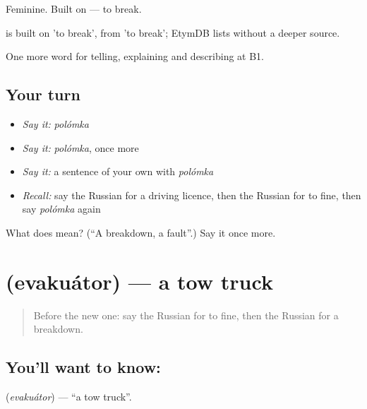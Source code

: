Feminine. Built on \emph{} — to break.

\begin{cousinweb}
\emph{} is built on \emph{} 'to break', from \emph{} 'to break'; EtymDB lists \emph{} without a deeper source.
\end{cousinweb}

\begin{grammarlens}[title={What you've built}]
One more word for telling, explaining and describing at B1.
\end{grammarlens}

\subsection*{Your turn}
\begin{itemize}
\raggedright
  \item \emph{Say it:} \emph{polómka}
  \item \emph{Say it:} \emph{polómka}, once more
  \item \emph{Say it:} a sentence of your own with \emph{polómka}
  \item \emph{Recall:} say the Russian for a driving licence, then the Russian for to fine, then say \emph{polómka} again
\end{itemize}

\begin{tcolorbox}[breakable,colback=teal!4,colframe=teal!35!black,title={Before you move on}]
What does  mean? (\textquotedblleft{}A breakdown, a fault\textquotedblright{}.) Say it once more.
\end{tcolorbox}
\section[\texorpdfstring{\ru{эвакуатор} (evakuátor)}{эвакуатор (evakuátor)}]{ (evakuátor) — a tow truck}

\label{lesson:RU-C409-evakuator}



\begin{quote}
Before the new one: say the Russian for to fine, then the Russian for a breakdown.
\end{quote}

\subsection*{You'll want to know: }
\textbf{} (\emph{evakuátor}) — \textquotedblleft{}a tow truck\textquotedblright{}.

